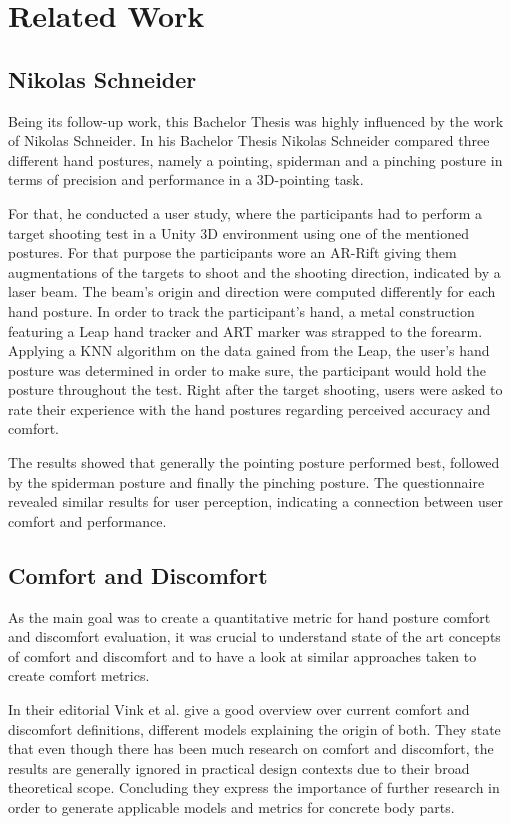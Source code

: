 \chapter{Related Work}\label{chapter:related}

\section{Nikolas Schneider}

Being its follow-up work, this Bachelor Thesis was highly influenced by the work of Nikolas Schneider. In his Bachelor Thesis Nikolas Schneider compared three different hand postures, namely a pointing, spiderman and a pinching posture in terms of precision and performance in a 3D-pointing task. 

For that, he conducted a user study, where the participants had to perform a target shooting test in a Unity 3D environment using one of the mentioned postures. For that purpose the participants wore an AR-Rift giving them augmentations of the targets to shoot and the shooting direction, indicated by a laser beam. The beam's origin and direction were computed differently for each hand posture.  In order to track the participant's hand, a metal construction featuring a Leap hand tracker and ART marker was strapped to the forearm. Applying a KNN algorithm on the data gained from the Leap, the user's hand posture was determined in order to make sure, the participant would hold the posture throughout the test. Right after the target shooting, users were asked to rate their experience with the hand postures regarding perceived accuracy and comfort. 

The results showed that generally the pointing posture performed best, followed by the spiderman posture and finally the pinching posture. The questionnaire revealed similar results for user perception, indicating a connection between user comfort and performance.

\section{Comfort and Discomfort}

As the main goal was to create a quantitative metric for hand posture comfort and discomfort evaluation, it was crucial to understand state of the art concepts of comfort and discomfort and to have a look at similar approaches taken to create comfort metrics.

In their editorial Vink et al. \cite{vink2012editorial} give a good overview over current comfort and discomfort definitions, different models explaining the origin of both. They state that even though there has been much research on comfort and discomfort, the results are generally ignored in practical design contexts due to their broad theoretical scope. Concluding they express the importance of further research in order to generate applicable models and metrics for concrete body parts.

